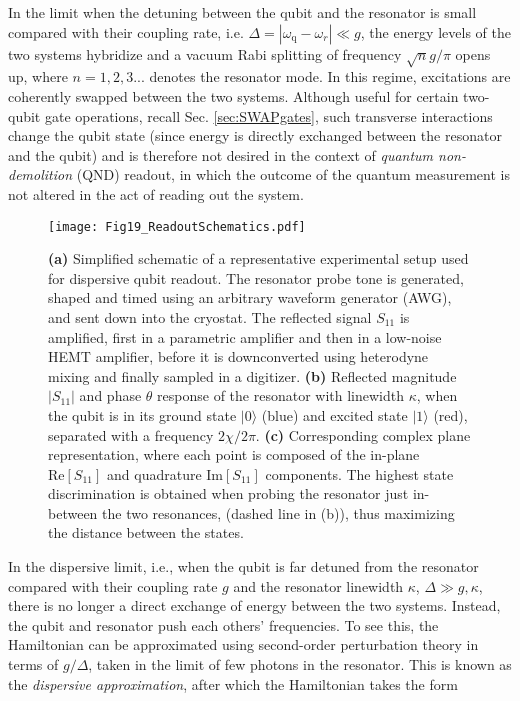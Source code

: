 \documentclass[aip,apr,twocolumn,showpacs,superscriptaddress,groupedaddress,nofootinbib,reprint]{revtex4-1}  %
\newcommand{\freq}{\omega_\text{q}}
\begin{document}
In the limit when the detuning between the qubit and the resonator is small compared with their coupling rate, i.e. $\Delta = |\freq - \omega_r| \ll g$, the energy levels of the two systems hybridize and a vacuum Rabi splitting of frequency $\sqrt{n}g/\pi$ opens up, where $n = 1,2,3...$ denotes the resonator mode. In this regime, excitations are coherently swapped between the two systems. Although useful for certain two-qubit gate operations, recall Sec. \ref{sec:SWAPgates}, such transverse interactions change the qubit state (since energy is directly exchanged between the resonator and the qubit) and is therefore not desired in the context of \textit{quantum non-demolition} (QND) readout, in which the outcome of the quantum measurement is not altered in the act of reading out the system.

\begin{figure}[t!]
\begin{center}
\texttt{[image: Fig19\_ReadoutSchematics.pdf]}
\caption{\textbf{(a)} Simplified schematic of a representative experimental setup used for dispersive qubit readout. The resonator probe tone is generated, shaped and timed using an arbitrary waveform generator (AWG), and sent down into the cryostat. The reflected signal $S_{11}$ is amplified, first in a parametric amplifier and then in a low-noise HEMT amplifier, before it is downconverted using heterodyne mixing and finally sampled in a digitizer. \textbf{(b)} Reflected magnitude $|S_{11}|$ and phase $\theta$ response of the resonator with linewidth $\kappa$, when the qubit is in its ground state $|0\rangle$ (blue) and excited state $|1\rangle$ (red), separated with a frequency $2\chi/2\pi$. \textbf{(c)} Corresponding complex plane representation, where each point is composed of the in-plane $\mbox{Re}[S_{11}]$ and quadrature $\mbox{Im}[S_{11}]$ components. The highest state discrimination is obtained when probing the resonator just in-between the two resonances, (dashed line in (b)), thus maximizing the distance between the states.}
\label{Fig:DISP}
\end{center}
\end{figure}

In the dispersive limit, i.e., when the qubit is far detuned from the resonator compared with their coupling rate $g$ and the resonator linewidth $\kappa$, $\Delta \gg g, \kappa$, there is no longer a direct exchange of energy between the two systems. Instead, the qubit and resonator push each others' frequencies. To see this, the Hamiltonian can be approximated using second-order perturbation theory\cite{Blais2004,Boissonneault2009} in terms of $g/\Delta$, taken in the limit of few photons in the resonator. This is known as the \textit{dispersive approximation}, after which the Hamiltonian takes the form
\end{document}

